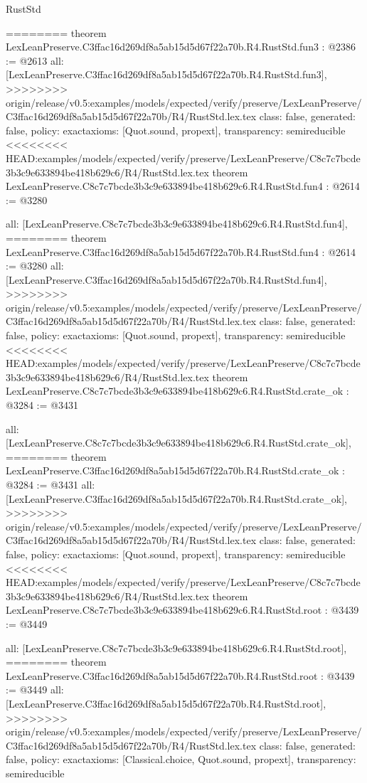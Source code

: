\begin{lexlean}{RustStd}
\begin{coremodule}
{\begin{coremodule}
{{{{{{========
theorem LexLeanPreserve.C3ffac16d269df8a5ab15d5d67f22a70b.R4.RustStd.fun3 : @2386 := @2613 {
  all: [LexLeanPreserve.C3ffac16d269df8a5ab15d5d67f22a70b.R4.RustStd.fun3],
>>>>>>>> origin/release/v0.5:examples/models/expected/verify/preserve/LexLeanPreserve/C3ffac16d269df8a5ab15d5d67f22a70b/R4/RustStd.lex.tex
  class: false,
  generated: false,
  policy: exact{axioms: [Quot.sound, propext]},
  transparency: semireducible
}
<<<<<<<< HEAD:examples/models/expected/verify/preserve/LexLeanPreserve/C8c7c7bcde3b3c9e633894be418b629c6/R4/RustStd.lex.tex
theorem LexLeanPreserve.C8c7c7bcde3b3c9e633894be418b629c6.R4.RustStd.fun4 : @2614 := @3280 {
  all: [LexLeanPreserve.C8c7c7bcde3b3c9e633894be418b629c6.R4.RustStd.fun4],
========
theorem LexLeanPreserve.C3ffac16d269df8a5ab15d5d67f22a70b.R4.RustStd.fun4 : @2614 := @3280 {
  all: [LexLeanPreserve.C3ffac16d269df8a5ab15d5d67f22a70b.R4.RustStd.fun4],
>>>>>>>> origin/release/v0.5:examples/models/expected/verify/preserve/LexLeanPreserve/C3ffac16d269df8a5ab15d5d67f22a70b/R4/RustStd.lex.tex
  class: false,
  generated: false,
  policy: exact{axioms: [Quot.sound, propext]},
  transparency: semireducible
}
<<<<<<<< HEAD:examples/models/expected/verify/preserve/LexLeanPreserve/C8c7c7bcde3b3c9e633894be418b629c6/R4/RustStd.lex.tex
theorem LexLeanPreserve.C8c7c7bcde3b3c9e633894be418b629c6.R4.RustStd.crate_ok : @3284 := @3431 {
  all: [LexLeanPreserve.C8c7c7bcde3b3c9e633894be418b629c6.R4.RustStd.crate_ok],
========
theorem LexLeanPreserve.C3ffac16d269df8a5ab15d5d67f22a70b.R4.RustStd.crate_ok : @3284 := @3431 {
  all: [LexLeanPreserve.C3ffac16d269df8a5ab15d5d67f22a70b.R4.RustStd.crate_ok],
>>>>>>>> origin/release/v0.5:examples/models/expected/verify/preserve/LexLeanPreserve/C3ffac16d269df8a5ab15d5d67f22a70b/R4/RustStd.lex.tex
  class: false,
  generated: false,
  policy: exact{axioms: [Quot.sound, propext]},
  transparency: semireducible
}
<<<<<<<< HEAD:examples/models/expected/verify/preserve/LexLeanPreserve/C8c7c7bcde3b3c9e633894be418b629c6/R4/RustStd.lex.tex
theorem LexLeanPreserve.C8c7c7bcde3b3c9e633894be418b629c6.R4.RustStd.root : @3439 := @3449 {
  all: [LexLeanPreserve.C8c7c7bcde3b3c9e633894be418b629c6.R4.RustStd.root],
========
theorem LexLeanPreserve.C3ffac16d269df8a5ab15d5d67f22a70b.R4.RustStd.root : @3439 := @3449 {
  all: [LexLeanPreserve.C3ffac16d269df8a5ab15d5d67f22a70b.R4.RustStd.root],
>>>>>>>> origin/release/v0.5:examples/models/expected/verify/preserve/LexLeanPreserve/C3ffac16d269df8a5ab15d5d67f22a70b/R4/RustStd.lex.tex
  class: false,
  generated: false,
  policy: exact{axioms: [Classical.choice, Quot.sound, propext]},
  transparency: semireducible
}

}}}}}}}}}
\end{coremodule}}
\end{coremodule}
\end{lexlean}
